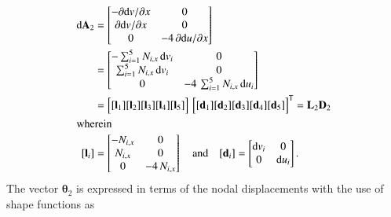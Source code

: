 \begin{subequations}
	\begin{align}
	\mathrm{d} \mathbf{A}_2 & =  \begin{bmatrix}
	- \partial \mathrm{d} v / \partial x &  0 \\
	\partial \mathrm{d} v / \partial x & 0 \\
	0 & -4 \, \partial \mathrm{d} u / \partial x  \end{bmatrix} \notag \\
	& = \begin{bmatrix}
	- \sum\nolimits_{i=1}^5 N_{i,x} \, \mathrm{d} v_i &  0 \\
	\sum\nolimits_{i=1}^5 N_{i,x} \, \mathrm{d} v_i &  0 \\
	0  & - 4 \, \sum\nolimits_{i=1}^5 N_{i,x} \, \mathrm{d} u_i  \end{bmatrix} \notag \\
	& = \begin{bmatrix}
	[\mathbf{l}_1] [\mathbf{l}_2] [\mathbf{l}_3] [\mathbf{l}_4] [\mathbf{l}_5] 
	\end{bmatrix}  \, \begin{bmatrix} [\mathbf{d}_1] [\mathbf{d}_2] [\mathbf{d}_3] [\mathbf{d}_4] [\mathbf{d}_5] \end{bmatrix}^{\mathsf{T}}
	= \mathbf{L}_2 \mathbf{D}_2 \\
	\intertext{wherein}
	[\mathbf{l}_i] & = \begin{bmatrix}
	- N_{i,x} &  0 \\
	N_{i,x} & 0 \\
	0  & - 4 \, N_{i,x} \end{bmatrix}  \quad \text{and} \quad	[\mathbf{d}_i] = \begin{bmatrix}
	\mathrm{d} v_i & 0 \\
	0 &  \mathrm{d} u_i  \end{bmatrix} .
	\end{align}
\end{subequations}
The vector $\boldsymbol{\theta}_2$ is expressed in terms of the nodal displacements with the use of shape functions as
\small

